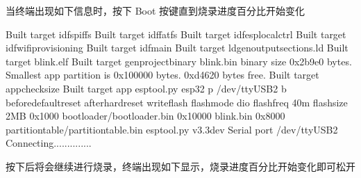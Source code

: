 \documentclass[a4paper,12pt,english]{sphinxmanual}
\begin{document}
\sphinxAtStartPar
当终端出现如下信息时，按下 Boot 按键直到烧录进度百分比开始变化

\begin{sphinxVerbatim}[commandchars=\\\{\}]
\PYG{o}{[} \PYGZpc{}\PYG{o}{]} Built target \PYGZus{}\PYGZus{}idf\PYGZus{}spiffs
\PYG{o}{[} \PYGZpc{}\PYG{o}{]} Built target \PYGZus{}\PYGZus{}idf\PYGZus{}fatfs
\PYG{o}{[} \PYGZpc{}\PYG{o}{]} Built target \PYGZus{}\PYGZus{}idf\PYGZus{}esp\PYGZus{}local\PYGZus{}ctrl
\PYG{o}{[}\PYGZpc{}\PYG{o}{]} Built target \PYGZus{}\PYGZus{}idf\PYGZus{}wifi\PYGZus{}provisioning
\PYG{o}{[}\PYGZpc{}\PYG{o}{]} Built target \PYGZus{}\PYGZus{}idf\PYGZus{}main
\PYG{o}{[}\PYGZpc{}\PYG{o}{]} Built target \PYGZus{}\PYGZus{}ldgen\PYGZus{}output\PYGZus{}sections.ld
\PYG{o}{[}\PYGZpc{}\PYG{o}{]} Built target blink.elf
\PYG{o}{[}\PYGZpc{}\PYG{o}{]} Built target gen\PYGZus{}project\PYGZus{}binary
blink.bin binary size 0x2b9e0 bytes. Smallest app partition is 0x100000 bytes. 0xd4620 bytes \PYGZpc{} free.
\PYG{o}{[}\PYGZpc{}\PYG{o}{]} Built target app\PYGZus{}check\PYGZus{}size
\PYG{o}{[}\PYGZpc{}\PYG{o}{]} Built target app
esptool.py esp32 \PYGZhy{}p /dev/ttyUSB2 \PYGZhy{}b  \PYGZhy{}\PYGZhy{}beforedefault\PYGZus{}reset \PYGZhy{}\PYGZhy{}afterhard\PYGZus{}reset write\PYGZus{}flash \PYGZhy{}\PYGZhy{}flash\PYGZus{}mode dio \PYGZhy{}\PYGZhy{}flash\PYGZus{}freq 40m \PYGZhy{}\PYGZhy{}flash\PYGZus{}size 2MB 0x1000 bootloader/bootloader.bin 0x10000 blink.bin 0x8000 partition\PYGZus{}table/partition\PYGZhy{}table.bin
esptool.py v3.3\PYGZhy{}dev
Serial port /dev/ttyUSB2
Connecting..............
\end{sphinxVerbatim}

\sphinxAtStartPar
按下后将会继续进行烧录，终端出现如下显示，烧录进度百分比开始变化即可松开
\end{document}
